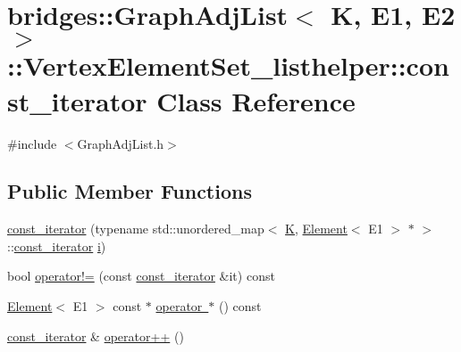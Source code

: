 \hypertarget{classbridges_1_1_graph_adj_list_1_1_vertex_element_set__listhelper_1_1const__iterator}{}\section{bridges\+::Graph\+Adj\+List$<$ K, E1, E2 $>$\+::Vertex\+Element\+Set\+\_\+listhelper\+::const\+\_\+iterator Class Reference}
\label{classbridges_1_1_graph_adj_list_1_1_vertex_element_set__listhelper_1_1const__iterator}


{\ttfamily \#include $<$Graph\+Adj\+List.\+h$>$}

\subsection*{Public Member Functions}
\begin{DoxyCompactItemize}
\item 
\mbox{\hyperlink{classbridges_1_1_graph_adj_list_1_1_vertex_element_set__listhelper_1_1const__iterator_a6df7b33e5e32f87ab2c6a9b41939d6ae}{const\+\_\+iterator}} (typename std\+::unordered\+\_\+map$<$ \mbox{\hyperlink{namespacebridges_acfb0a4f7877d8f63de3e6862004c50edaa5f3c6a11b03839d46af9fb43c97c188}{K}}, \mbox{\hyperlink{classbridges_1_1_element}{Element}}$<$ E1 $>$ $\ast$ $>$\+::\mbox{\hyperlink{classbridges_1_1_graph_adj_list_1_1_vertex_element_set__listhelper_1_1const__iterator}{const\+\_\+iterator}} \mbox{\hyperlink{namespacebridges_acfb0a4f7877d8f63de3e6862004c50eda865c0c0b4ab0e063e5caa3387c1a8741}{i}})
\item 
bool \mbox{\hyperlink{classbridges_1_1_graph_adj_list_1_1_vertex_element_set__listhelper_1_1const__iterator_adec12879bc99de5fbeaa4b528f0479dc}{operator!=}} (const \mbox{\hyperlink{classbridges_1_1_graph_adj_list_1_1_vertex_element_set__listhelper_1_1const__iterator}{const\+\_\+iterator}} \&it) const
\item 
\mbox{\hyperlink{classbridges_1_1_element}{Element}}$<$ E1 $>$ const  $\ast$ \mbox{\hyperlink{classbridges_1_1_graph_adj_list_1_1_vertex_element_set__listhelper_1_1const__iterator_a2fbde417e7178416a46d7b0449db9052}{operator $\ast$}} () const
\item 
\mbox{\hyperlink{classbridges_1_1_graph_adj_list_1_1_vertex_element_set__listhelper_1_1const__iterator}{const\+\_\+iterator}} \& \mbox{\hyperlink{classbridges_1_1_graph_adj_list_1_1_vertex_element_set__listhelper_1_1const__iterator_a44523a95bdf756876509aef9fb79db73}{operator++}} ()
\end{DoxyCompactItemize}


